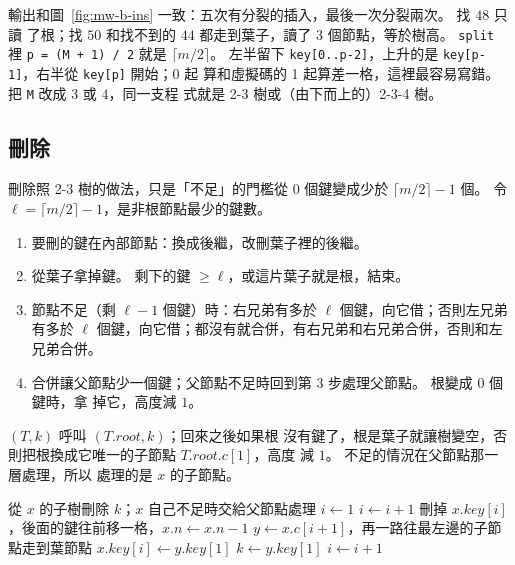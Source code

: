 輸出和圖~\ref{fig:mw-b-ins} 一致：五次有分裂的插入，最後一次分裂兩次。 找 $48$ 只讀
了根；找 $50$ 和找不到的 $44$ 都走到葉子，讀了 $3$ 個節點，等於樹高。
\texttt{split} 裡 \texttt{p = (M + 1) / 2} 就是 $\lceil m/2 \rceil$。 左半留下
\texttt{key[0..p-2]}，上升的是 \texttt{key[p-1]}，右半從 \texttt{key[p]} 開始；0 起
算和虛擬碼的 1 起算差一格，這裡最容易寫錯。 把 \texttt{M} 改成 $3$ 或 $4$，同一支程
式就是 2-3 樹或（由下而上的）2-3-4 樹。

\subsection{刪除}
\label{sec:mw-delete}

刪除照 2-3 樹的做法，只是「不足」的門檻從 $0$ 個鍵變成少於 $\lceil m/2 \rceil - 1$
個。 令 $\ell = \lceil m/2 \rceil - 1$，是非根節點最少的鍵數。
\begin{enumerate}
\item 要刪的鍵在內部節點：換成後繼，改刪葉子裡的後繼。
\item 從葉子拿掉鍵。 剩下的鍵 $\ge \ell$，或這片葉子就是根，結束。
\item 節點不足（剩 $\ell - 1$ 個鍵）時：右兄弟有多於 $\ell$ 個鍵，向它借；否則左兄弟有多於
$\ell$ 個鍵，向它借；都沒有就合併，有右兄弟和右兄弟合併，否則和左兄弟合併。
\item 合併讓父節點少一個鍵；父節點不足時回到第 3 步處理父節點。 根變成 $0$ 個鍵時，拿
掉它，高度減 $1$。
\end{enumerate}

$(T, k)$ 呼叫 $(T.\mathit{root}, k)$；回來之後如果根
沒有鍵了，根是葉子就讓樹變空，否則把根換成它唯一的子節點 $T.\mathit{root}.c[1]$，高度
減 $1$。 不足的情況在父節點那一層處理，所以  處理的是 $x$ 的子節點。

\begin{pseudo}[label=alg:mw-deldown]{從 $x$ 的子樹刪除 $k$；$x$ 自己不足時交給父節點處理}
    \State $i \gets 1$
        \State $i \gets i + 1$
    \EndWhile
            \State 刪掉 $x.\mathit{key}[i]$，後面的鍵往前移一格，$x.n \gets x.n - 1$
        \EndIf
        \State \Return
    \EndIf
     
        \State $y \gets x.c[i+1]$，再一路往最左邊的子節點走到葉節點
        \State $x.\mathit{key}[i] \gets y.\mathit{key}[1]$ 
        \State $k \gets y.\mathit{key}[1]$
        \State $i \gets i + 1$ 
    \EndIf
    \State {}
        \State {}
    \EndIf
\EndProcedure
\end{pseudo}

